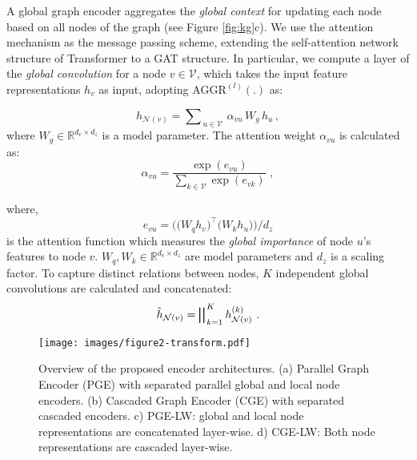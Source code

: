 \documentclass[11pt,a4paper]{article}
\begin{document}
A global graph encoder aggregates the \textit{global context} for updating each node based on all nodes of the graph (see Figure \ref{fig:kg}c). We use the attention mechanism as the message passing scheme, extending the self-attention network structure of Transformer to a GAT structure. In particular, we compute a layer of the \textit{global convolution} for a node $v \in \mathcal{V}$, which takes the input feature representations $h_v$ as input, adopting $\textrm{AGGR}^{(l)}(.)$ as:

\begin{equation}
h_{\mathcal{N}(v)} = \sum\nolimits_{\, u \in \mathcal{V}} \, \alpha_{vu} \, W_{g} \, h_u \, ,
\label{eq:global1}
\end{equation}
where $W_{g} \in \mathbb{R}^{d_v \times d_z}$ is a model parameter. The attention weight $\alpha_{vu}$ is calculated as:
\begin{equation}
\alpha_{vu} = \frac{\exp(e_{vu})}{ \sum_{k \in \mathcal{V}} \exp(e_{vk})}\,\, ,
\end{equation}

\noindent where, 
\begin{equation}
e_{vu} = \Big( \big( W_{q} h_v \big)^{\top}  \big( W_{k} h_u \big) \Big) / d_z
\label{eq:global3}
\end{equation}
is the attention function which measures the \emph{global importance} of node $u$'s features to node $v$. $W_{q}, W_{k} \in \mathbb{R}^{d_v \times d_z}$ are model parameters and $d_z$ is a scaling factor. 
To capture distinct relations between nodes, $K$ independent global convolutions are calculated and concatenated:
\begin{equation}
\hat{h}_{\mathcal{N}(v)} = \bigparallel\nolimits_{\, k=1}^{\, K} h^{(k)}_{\mathcal{N}(v)} \,\, .
\label{eq:concat}
\end{equation}



\begin{figure*}[t]
    \centering
    \texttt{[image: images/figure2-transform.pdf]}
    \vspace{-7mm}
    \caption{Overview of the proposed encoder architectures. (a) Parallel Graph Encoder ({\selectfont PGE}) with separated parallel global and local node encoders. (b) Cascaded Graph Encoder ({\selectfont CGE}) with separated cascaded encoders. c) {\selectfont PGE-LW}: global and local node representations are concatenated layer-wise. d) {\selectfont CGE-LW}: Both node representations are cascaded layer-wise.}
    \label{fig:encoder}
\end{figure*}
\end{document}
